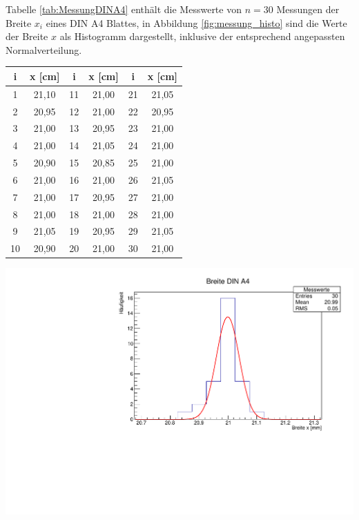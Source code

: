 Tabelle \ref{tab:MessungDINA4} enthält die Messwerte von $n=30$ Messungen der Breite $x_i$ eines DIN A4 Blattes, in Abbildung \ref{fig:messung_histo} sind die Werte der Breite $x$ als Histogramm dargestellt, inklusive der entsprechend angepassten Normalverteilung.

\begin{minipage}[b]{.5\textwidth}
	\centering
		\begin{tabular}[t]{|c|c||c|c||c|c|} 
			i & x [cm] & i & x [cm] & i & x [cm]\\
			\hline
			1 & 21,10 & 11 & 21,00 & 21 & 21,05\\
			2 & 20,95 & 12 & 21,00 & 22 & 20,95\\
			3 & 21,00 & 13 & 20,95 & 23 & 21,00\\
			4 & 21,00 & 14 & 21,05 & 24 & 21,00\\
			5 & 20,90 & 15 & 20,85 & 25 & 21,00\\
			6 & 21,00 & 16 & 21,00 & 26 & 21,05\\
			7 & 21,00 & 17 & 20,95 & 27 & 21,00\\
			8 & 21,00 & 18 & 21,00 & 28 & 21,00\\
			9 & 21,05 & 19 & 20,95 & 29 & 21,05\\
			10& 20,90 & 20 & 21,00 & 30 & 21,00\\
		\end{tabular}
	\label{tab:MessungDINA4}
\end{minipage}
%
\begin{minipage}[b]{.5\textwidth}
	\includegraphics[width=1.00\textwidth]{00_einl/messung_histo.pdf}
	\label{fig:messung_histo}
\end{minipage}

